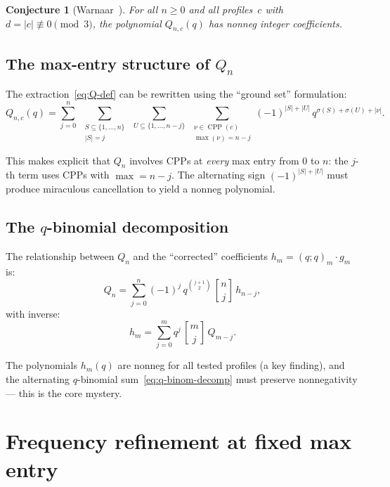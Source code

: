 \documentclass[11pt]{article}
\newtheorem{conjecture}[theorem]{Conjecture}
\newcommand{\CPP}{\operatorname{CPP}}
\newcommand{\qpochn}[3]{(#1;#2)_{#3}}
\newcommand{\qbin}[2]{\genfrac{[}{]}{0pt}{}{#1}{#2}}
\begin{document}
\begin{conjecture}[Warnaar~\cite{warnaar-2021}]
\label{conj:warnaar}
For all $n \geq 0$ and all profiles~$c$ with
$d = |c| \not\equiv 0 \pmod{3}$, the polynomial
$Q_{n,c}(q)$ has nonneg integer coefficients.
\end{conjecture}

\subsection{The max-entry structure of $Q_n$}

The extraction~\eqref{eq:Q-def} can be rewritten
using the ``ground set'' formulation:
\begin{equation}\label{eq:Q-ground-set}
  Q_{n,c}(q) = \sum_{j=0}^{n}\;
  \sum_{\substack{S \subseteq \{1,\ldots,n\} \\ |S|=j}}\;
  \sum_{U \subseteq \{1,\ldots,n-j\}}\;
  \sum_{\substack{\nu \in \CPP(c) \\
  \max(\nu) = n-j}}
  (-1)^{|S|+|U|}\, q^{\sigma(S)+\sigma(U)+|\nu|}.
\end{equation}

This makes explicit that $Q_n$ involves CPPs at
\emph{every} max entry from $0$ to $n$: the $j$-th term
uses CPPs with $\max = n - j$. The alternating sign
$(-1)^{|S|+|U|}$ must produce miraculous cancellation to
yield a nonneg polynomial.

\subsection{The $q$-binomial decomposition}

The relationship between $Q_n$ and the ``corrected''
coefficients $h_m = \qpochn{q}{q}{m} \cdot g_m$ is:
\begin{equation}\label{eq:q-binom-decomp}
  Q_n = \sum_{j=0}^{n} (-1)^j\, q^{\binom{j+1}{2}}\,
  \qbin{n}{j}\, h_{n-j},
\end{equation}
with inverse:
\begin{equation}\label{eq:q-binom-inverse}
  h_m = \sum_{j=0}^{m} q^j\, \qbin{m}{j}\, Q_{m-j}.
\end{equation}

The polynomials $h_m(q)$ are nonneg for all tested
profiles (a key finding), and the alternating
$q$-binomial sum~\eqref{eq:q-binom-decomp} must preserve
nonnegativity --- this is the core mystery.

\section{Frequency refinement at fixed max entry}
\label{sec:frequency}
\end{document}
